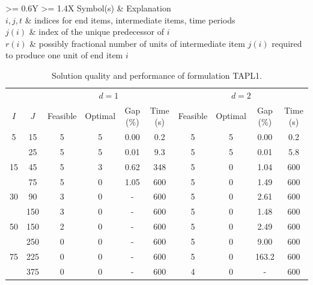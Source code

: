 \documentclass{article}
\begin{document}
\begin{table}[h]
\centering
\caption{Indices, sets, parameters, and decision variables.}
\begin{tabularx}{\textwidth}{
	>{\hsize = 0.6\hsize}Y %
	>{\hsize = 1.4\hsize \raggedleft\arraybackslash}X
}
\hline
Symbol(s)	& Explanation \\
\hline
$i, j, t$	& indices for end items, intermediate items, time periods \\
$j(i)$	& index of the unique predecessor of $i$ \\
$r(i)$	& possibly fractional number of units of intermediate item $j(i)$ required to produce one unit of end item $i$ \\
\hline
\end{tabularx}
\end{table}

\lipsum[1][4-5]

\newpage


\lipsum[1][1-3]

\begin{table}[h]
\centering
\caption{Solution quality and performance of formulation TAPL1.}
\label{tab:TAPL1}
\begin{tabular}{*{10}{c}}
\hline
& & \multicolumn{4}{c}{$d = 1$} & \multicolumn{4}{c}{$d = 2$} \\
\cmidrule(lr){3-6} \cmidrule(l){7-10}
$I$ & $J$ & Feasible & Optimal & Gap (\%) & Time (s) & Feasible & Optimal & Gap (\%) & Time (s) \\
\hline
5	& 15	& 5 		& 5 		& 0.00	& 0.2	& 5 		& 5 		& 0.00		& 0.2 \\
 	& 25 	& 5 		& 5 		& 0.01 	& 9.3 	& 5 		& 5 		& 0.01		& 5.8 \\
\hline
15	& 45 	& 5 		& 3 		& 0.62 	& 348 	& 5 		& 0 		& 1.04		& 600 \\ 
	& 75 	& 5 		& 0 		& 1.05 	& 600 	& 5 		& 0 		& 1.49		& 600 \\
\hline
30 	& 90 	& 3 		& 0 		& - 		& 600 	& 5 		& 0 		& 2.61		& 600 \\
	& 150	& 3 		& 0 		& - 		& 600 	& 5 		& 0 		& 1.48		& 600 \\
\hline
50 	& 150 	& 2 		& 0 		& - 		& 600 	& 5 		& 0 		& 2.49		& 600 \\
	& 250	& 0 		& 0 		& -		& 600 	& 5 		& 0 		& 9.00		& 600 \\
\hline
75 	& 225 	& 0 		& 0 		& - 		& 600 	& 5 		& 0 		& 163.2		& 600 \\
	& 375	& 0 		& 0 		& - 		& 600 	& 4 		& 0 		& -			& 600 \\
\hline
\end{tabular}
\end{table}
\end{document}
